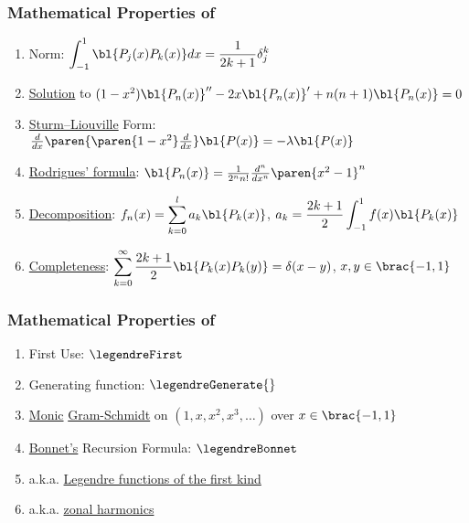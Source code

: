 \begin{frame}\frametitle{Mathematical Properties of \legendremathworld}
\begin{enumerate}
	\item Norm: $\displaystyle\int_{-1}^{1}\bl{P_{j}(x)P_{k}(x)}dx = \frac{1}{2k+1}\delta_{j}^{k}$
	\item \href{https://mathworld.wolfram.com/LegendreDifferentialEquation.html}{Solution} to $(1-x^{2}) \bl{P_{n}(x)}'' -2x \bl{P_{n}(x)}' + n(n+1)\bl{P_{n}(x)} = 0$\\[10pt]
	\item \href{https://en.wikipedia.org/wiki/Sturm\%E2\%80\%93Liouville_theory}{Sturm--Liouville} Form: $\frac{d}{dx}\paren{\paren{1-x^{2}}\frac{d}{dx}}\bl{P(x)} = - \lambda \bl{P(x)}$\\[10pt]
	\item \href{https://en.wikipedia.org/wiki/Rodrigues\%27\_formula}{Rodrigues' formula}: $\bl{P_{n}(x)} = \frac{1}{2^{n}n!}\frac{d^{n}}{dx^{n}}\paren{x^{2} - 1}^{n} $\\[10pt]
	\item \href{https://mathworld.wolfram.com/OrthogonalDecomposition.html}{Decomposition}: $f_{n}(x) = \displaystyle \sum_{k=0}^{l}a_{k} \bl{P_{k}(x)}$, $a_{k} = \displaystyle\frac{2k+1}{2}\int_{-1}^{1} f(x) \bl{P_{k}(x)}$\\[10pt]
	\item \href{https://mathworld.wolfram.com/CompleteOrthogonalSystem.html}{Completeness}: $\displaystyle\sum_{k=0}^{\infty}\frac{2k+1}{2}\bl{P_{k}(x)P_{k}(y)} = \delta(x-y)$, $x,y\in\brac{-1,1}$
\end{enumerate}
\end{frame}

\begin{frame}\frametitle{Mathematical Properties of \legendremathworld\jumpLittle}
\begin{enumerate}
	\item First Use: $\legendreFirst$
	\item Generating function: $\legendreGenerate{}$
	\item \href{https://mathworld.wolfram.com/MonicPolynomial.html}{Monic} \href{https://mathworld.wolfram.com/Gram-SchmidtOrthonormalization.html}{Gram-Schmidt} on $(1, x, x^{2}, x^{3}, \dots)$ over $x\in\brac{-1,1}$
	\item \href{https://en.wikipedia.org/wiki/Legendre\_polynomials\#Definition\_via\_generating\_function}{Bonnet’s} Recursion Formula: $\legendreBonnet$
	\item a.k.a. \href{https://mathworld.wolfram.com/LegendrePolynomial.html}{Legendre functions of the first kind}
	\item a.k.a. \href{https://mathworld.wolfram.com/ZonalHarmonic.html}{zonal harmonics}
\end{enumerate}
\end{frame}

